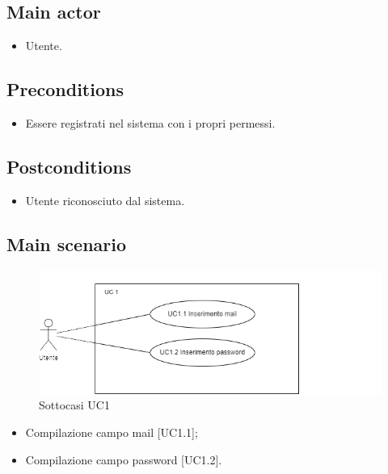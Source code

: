 \documentclass{article}
\begin{document}
     \subsection*{Main actor}
         \begin{itemize}
             \item Utente.
         \end{itemize}
     \subsection*{Preconditions} 
        \begin{itemize}
            \item Essere registrati nel sistema con i propri permessi.
        \end{itemize}
               
    \subsection*{Postconditions}
        \begin{itemize}
            \item Utente riconosciuto dal sistema.
        \end{itemize}
    \subsection*{Main scenario}
        \begin{figure}[h]
            \centering
            \includegraphics{./imgUML/UC1-zoom.png}
            \caption{Sottocasi UC1}
            \label{fig:UC1_sottocasi}
        \end{figure}
            
        \begin{itemize}
            \item Compilazione campo mail [UC1.1];
            \item Compilazione campo password [UC1.2].
        \end{itemize}
            
\end{document}

